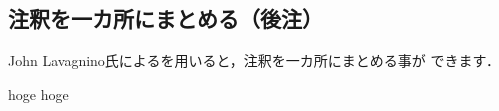%
%

\subsection{注釈を一カ所にまとめる（後注）}

John Lavagnino氏によるを用いると，注釈を一カ所にまとめる事が
できます．

\begin{usage}
 \usepackage{endnotes}
 \theendnotes %
 \renewcommand{\notesname}{$\<後注見出し>$}
\end{usage}

\begin{inout}
\usepackage{endnotes}
hoge
hoge
\renewcommand{\notesname}{後注}
\theendnotes
\end{inout}

%
%
%




